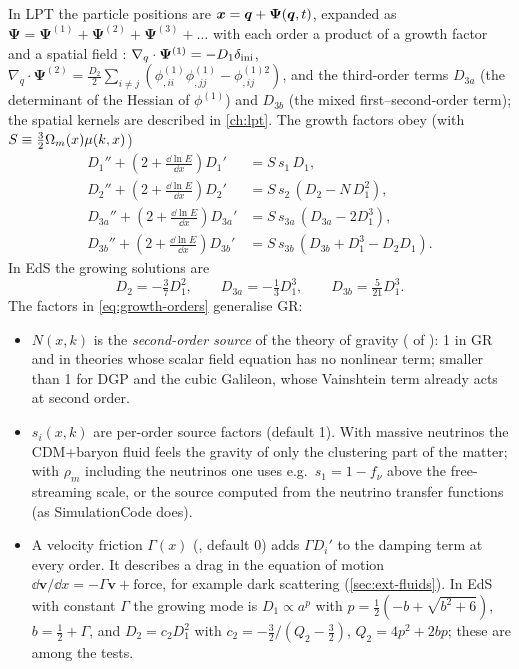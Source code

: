 In LPT the particle positions are $\bm{x}=\bm{q}+\bm\Psi(\bm{q},t)$, expanded as
$\bm\Psi=\bm\Psi^{(1)}+\bm\Psi^{(2)}+\bm\Psi^{(3)}+\ldots$ with each order a product of a growth factor and a spatial
field \cite{Bouchet1995}: $\nabla_q\cdot\bm\Psi^{(1)}=-D_1\delta_{\rm ini}$, $\nabla_q\cdot\bm\Psi^{(2)}=
\frac{D_2}{2}\sum_{i\ne j}(\phi^{(1)}_{,ii}\phi^{(1)}_{,jj}-\phi^{(1)2}_{,ij})$, and the third-order terms $D_{3a}$ (the
determinant of the Hessian of $\phi^{(1)}$) and $D_{3b}$ (the mixed first--second-order term); the spatial
kernels are described in \cref{ch:lpt}. The growth factors obey (with $S\equiv\frac32\Omega_m(x)\mu(k,x)$)
\begin{align}
D_1''+\left(2+\tfrac{\dd\ln E}{\dd x}\right)D_1'&=S\,s_1\,D_1,\label{eq:growth-orders}\\
D_2''+\left(2+\tfrac{\dd\ln E}{\dd x}\right)D_2'&=S\,s_2\,(D_2-N\,D_1^2),\nonumber\\
D_{3a}''+\left(2+\tfrac{\dd\ln E}{\dd x}\right)D_{3a}'&=S\,s_{3a}\,(D_{3a}-2D_1^3),\nonumber\\
D_{3b}''+\left(2+\tfrac{\dd\ln E}{\dd x}\right)D_{3b}'&=S\,s_{3b}\,(D_{3b}+D_1^3-D_2D_1).\nonumber
\end{align}
In EdS the growing solutions are
\begin{equation}
D_2=-\tfrac37D_1^2,\qquad D_{3a}=-\tfrac13D_1^3,\qquad D_{3b}=\tfrac{5}{21}D_1^3 .
\end{equation}
The factors in \cref{eq:growth-orders} generalise GR:
\begin{itemize}
\item $N(x,k)$ is the \emph{second-order source} of the theory of gravity ( of
      ): 1 in GR and in theories whose scalar field equation has no nonlinear term; smaller
      than 1 for DGP and the cubic Galileon, whose Vainshtein term already acts at second order.
\item $s_i(x,k)$ are per-order source factors (default 1). With massive neutrinos the CDM+baryon fluid feels the
      gravity of only the clustering part of the matter; with $\rho_m$ including the neutrinos one uses e.g.\
      $s_1=1-f_\nu$ above the free-streaming scale, or the source computed from the neutrino transfer functions
      (as SimulationCode does).
\item A velocity friction $\Gamma(x)$ (, default 0) adds $\Gamma D_i'$ to the damping term at every
      order. It describes a drag in the equation of motion $\dd\bm v/\dd x=-\Gamma\bm v+\text{force}$, for example
      dark scattering (\cref{sec:ext-fluids}). In EdS with constant $\Gamma$ the growing mode is $D_1\propto a^p$ with
      $p=\frac12\left(-b+\sqrt{b^2+6}\right)$, $b=\frac12+\Gamma$, and $D_2=c_2D_1^2$ with
      $c_2=-\frac32/(Q_2-\frac32)$, $Q_2=4p^2+2bp$; these are among the tests.
\end{itemize}

